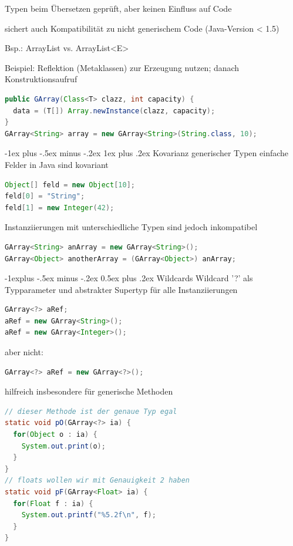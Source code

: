\documentclass[10pt]{article}
\makeatletter
\renewcommand{\subsection}{\@startsection{subsection}{2}{0mm}%
                                {-1explus -.5ex minus -.2ex}%
                                {0.5ex plus .2ex}%
                                {\normalfont\normalsize\bfseries}}
\renewcommand{\subsubsection}{\@startsection{subsubsection}{3}{0mm}%
                                {-1ex plus -.5ex minus -.2ex}%
                                {1ex plus .2ex}%
                                {\normalfont\small\bfseries}}
\makeatother
\begin{document}
Typen beim Übersetzen geprüft, aber keinen Einfluss auf Code

sichert auch Kompatibilität zu nicht generischem Code (Java-Version < 1.5) 

Bsp.: ArrayList vs. ArrayList<E>

Beispiel: Reflektion (Metaklassen) zur Erzeugung nutzen; danach Konstruktionsaufruf
\begin{lstlisting}[language=java]
public GArray(Class<T> clazz, int capacity) {
  data = (T[]) Array.newInstance(clazz, capacity);
}
GArray<String> array = new GArray<String>(String.class, 10);
\end{lstlisting}

\subsubsection{Kovarianz generischer Typen}
einfache Felder in Java sind kovariant
\begin{lstlisting}[language=java]
Object[] feld = new Object[10];
feld[0] = "String";
feld[1] = new Integer(42);
\end{lstlisting}

Instanziierungen mit unterschiedliche Typen sind jedoch inkompatibel
\begin{lstlisting}[language=java]
GArray<String> anArray = new GArray<String>();
GArray<Object> anotherArray = (GArray<Object>) anArray;
\end{lstlisting}

\subsection{Wildcards}
Wildcard '?' als Typparameter und abstrakter Supertyp für alle Instanziierungen
\begin{lstlisting}[language=java]
GArray<?> aRef;
aRef = new GArray<String>();
aRef = new GArray<Integer>();
\end{lstlisting}
aber nicht:
\begin{lstlisting}[language=java]
GArray<?> aRef = new GArray<?>();
\end{lstlisting}

hilfreich insbesondere für generische Methoden
\begin{lstlisting}[language=java]
// dieser Methode ist der genaue Typ egal
static void pO(GArray<?> ia) {
  for(Object o : ia) {
    System.out.print(o);
  }
}
// floats wollen wir mit Genauigkeit 2 haben
static void pF(GArray<Float> ia) {
  for(Float f : ia) {
    System.out.printf("%5.2f\n", f);
  }
}
\end{lstlisting}
\end{document}
